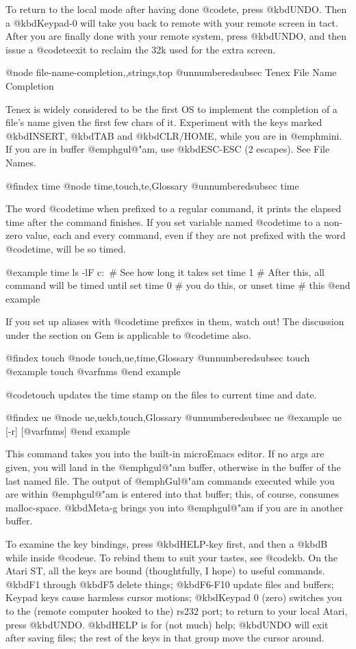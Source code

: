 {{{To return to the local mode after having done @code{te}, press @kbd{UNDO}.
Then a @kbd{Keypad-0} will take you back to remote with your remote screen
in tact.  After you are finally done with your remote system, press
@kbd{UNDO}, and then issue a @code{teexit} to reclaim the 32k used for the
extra screen.

@node file-name-completion,,strings,top
@unnumberedsubsec Tenex File Name Completion

Tenex is widely considered to be the first OS to implement the completion
of a file's name given the first few chars of it.  Experiment with the keys
marked @kbd{INSERT}, @kbd{TAB} and @kbd{CLR/HOME}, while you are in
@emph{mini}.  If you are in buffer @emph{gul@"am}, use @kbd{ESC-ESC} (2
escapes).  See File Names.

@findex time
@node time,touch,te,Glossary
@unnumberedsubsec time

The word @code{time} when prefixed to a regular command, it prints the
elapsed time after the command finishes.  If you set variable
named @code{time}  to  a non-zero value, each and every command, even
if  they  are  not  prefixed  with  the  word @code{time},  will be so
timed.  

@example
time  ls -lF c:\        # See how long it takes 
set   time  1           # After this, all command will be timed until 
set   time 0            # you do this, or 
unset time              # this 
@end example

If you set up aliases with @code{time} prefixes in them, watch out!  The
discussion under the section on Gem is applicable to @code{time} also.

@findex touch
@node touch,ue,time,Glossary
@unnumberedsubsec touch
@example
touch @var{fnms}
@end example

@code{touch}  updates  the  time  stamp on the files to current time and
date.  

@findex ue
@node ue,uekb,touch,Glossary
@unnumberedsubsec ue
@example
ue [-r] [@var{fnms}]
@end example

This command takes you into the built-in microEmacs editor.  If
no  args  are  given,  you  will  land  in  the  @emph{gul@"am}  buffer,
otherwise in the buffer of the last named file.  The output of
@emph{Gul@"am} commands executed while you are within @emph{gul@"am} is
entered into that buffer; this, of course, consumes malloc-space.
@kbd{Meta-g} brings you into @emph{gul@"am} if you are in another buffer.

To examine the key bindings, press @kbd{HELP}-key first, and then a @kbd{B}
while inside @code{ue}.  To rebind them to suit your tastes, see @code{kb}.
On the Atari ST, all the keys are bound (thoughtfully, I hope) to useful
commands.  @kbd{F1} through @kbd{F5} delete things; @kbd{F6-F10} update
files and buffers; Keypad keys cause harmless cursor motions; @kbd{Keypad
0} (zero) switches you to the (remote computer hooked to the) rs232 port;
to return to your local Atari, press @kbd{UNDO}.  @kbd{HELP} is for (not
much) help; @kbd{UNDO} will exit after saving files; the rest of the keys
in that group move the cursor around.

}}}
